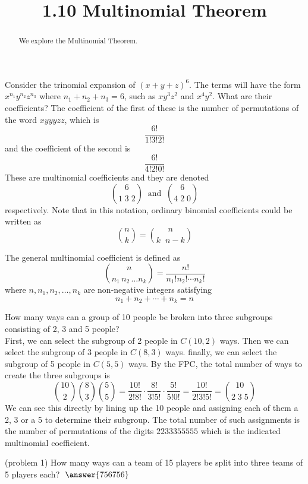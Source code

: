\documentclass[handout]{ximera}
\title{1.10 Multinomial Theorem}
\begin{document}
\begin{abstract}
We explore the Multinomial Theorem.
\end{abstract}

\maketitle

Consider the trinomial expansion of $(x+y+z)^6$.  
The terms will have the form $x^{n_1}y^{n_2}z^{n_3}$ where $n_1+n_2+n_3 = 6$, such as  $xy^3z^2$ and $x^4y^2$.  What are their coefficients?
The coefficient of the first of these is the number of permutations of the word $xyyyzz$, which is
\[
\frac{6!}{1!3!2!}
\]
and the coefficient of the second is 
\[
\frac{6!}{4!2!0!}
\]
These are multinomial coefficients and they are denoted
\[
\binom{6}{1\; 3\; 2} \;\; \text{and} \;\; \binom{6}{4\; 2\; 0}
\]
respectively.
Note that in this notation, ordinary binomial coefficients could be written as 
\[
\binom{n}{k} = \binom{n}{k\;\; n-k}
\]

The general multinomial coefficient is defined as
\[
\binom{n}{n_1\, n_2 \, \dots n_k} = \frac{n!}{n_1! n_2! \cdots n_k!}
\]
where $n, n_1, n_2, \dots, n_k$ are non-negative integers satisfying
\[
n_1 + n_2 + \cdots + n_k = n
\]


\begin{example}[example 1] How many ways can a group of 10 people be broken into three subgroups consisting 
of 2, 3 and 5 people?\\
First, we can select the subgroup of 2 people in $C(10, 2)$ ways. Then we can select the subgroup of 3 people
in $C(8,3)$ ways. finally, we can select the subgroup of 5 people in $C(5,5)$ ways. 
By the FPC, the total number of ways to create the three subgroups is
\[
\binom{10}{2} \binom{8}{3} \binom{5}{5} = \frac{10!}{2! 8!} \cdot \frac{8!}{3! 5!}
 \cdot \frac{5!}{5! 0!} = \frac{10!}{2! 3! 5!} = \binom{10}{2\;3\;5}
\]
We can see this directly by lining up the 10 people and assigning each of them a 
2, 3 or a 5 to determine their subgroup.
The total number of such assignments is the number of 
permutations of the digits
$2233355555$ which is the indicated multinomial coefficient.
\end{example}

\begin{problem}(problem 1)
How many ways can a team of 15 players be split into three teams of 5 players each? $\; \answer{756756}$
\end{problem}
\end{document}

